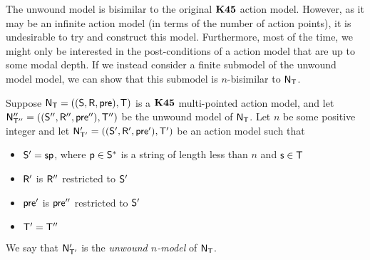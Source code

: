 The unwound model is bisimilar to the original $\AXKFF$ action model.
However, as it may be an infinite action model (in terms of the number of action
points), it is undesirable to try and construct this model.
Furthermore, most of the time, we might only be interested in the
post-conditions of a action model that are up to some modal depth.
If we instead consider a finite submodel of the unwound model
model, we can show that this submodel is $n$-bisimilar to $\evM_\evT$.

\begin{defn} \label{unwoundNModel}
  Suppose $\evM_\evT = ((\evS,\evR,\evpr),\evT)$ is a $\AXKFF$ multi-pointed action model, and
	let $\evM''_{\evT''} = ((\evS'',\evR'',\evpr''),\evT'')$ be the unwound model of $\evM_\evT$.
  Let $n$ be some positive integer and let $\evM'_{\evT'} = ((\evS',\evR',\evpr'),\evT')$ be an action model such that
  \begin{itemize}
		\item $\evS' = \evs \evp$, where $\evp \in \evS^\ast$ is a string of length
    less than $n$ and $\evs \in \evT$
		\item $\evR'$ is $\evR''$ restricted to $\evS'$
		\item $\evpr'$ is $\evpr''$ restricted to $\evS'$
		\item $\evT' = \evT''$
  \end{itemize}
  We say that $\evM'_{\evT'}$ is the {\em unwound $n$-model} of $\evM_\evT$.
\end{defn}

